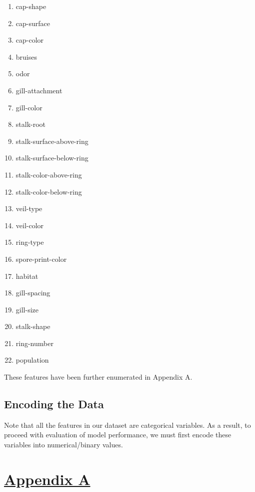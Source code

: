 \documentclass[fleqn]{article}
\begin{document}
    \begin{multicols}{3}
        \begin{enumerate}
            \item cap-shape
            \item cap-surface
            \item cap-color
            \item bruises
            \item odor
            \item gill-attachment
            \item gill-color
            \item stalk-root
            \item stalk-surface-above-ring
            \item stalk-surface-below-ring
            \item stalk-color-above-ring
            \item stalk-color-below-ring
            \item veil-type
            \item veil-color
            \item ring-type
            \item spore-print-color
            \item habitat
            \item gill-spacing
            \item gill-size
            \item stalk-shape
            \item ring-number
            \item population
        \end{enumerate}
    \end{multicols}

    These features have been further enumerated in Appendix A.

    \subsection{Encoding the Data}

    Note that all the features in our dataset are categorical variables. As a result, to
    proceed with evaluation of model performance, we must first encode these variables
    into numerical/binary values.

    \newpage
    \section*{\underline{Appendix A}}
\end{document}
